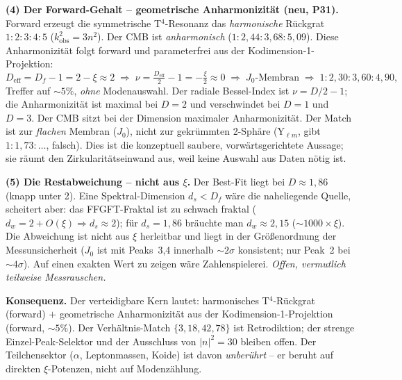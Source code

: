 \textbf{(4) Der Forward-Gehalt -- geometrische Anharmonizität (neu, P31).}
Forward erzeugt die symmetrische T$^4$-Resonanz das \emph{harmonische}
Rückgrat $1:2:3:4:5$ ($k^2_\mathrm{obs}=3n^2$). Der CMB ist
\emph{anharmonisch} ($1:2{,}44:3{,}68:5{,}09$). Diese Anharmonizität folgt
forward und parameterfrei aus der Kodimension-1-Projektion:
\[
  D_\mathrm{eff}=D_f-1=2-\xi\approx2
  \;\Rightarrow\;
  \nu=\tfrac{D_\mathrm{eff}}{2}-1=-\tfrac{\xi}{2}\approx0
  \;\Rightarrow\;
  J_0\text{-Membran}
  \;\Rightarrow\;
  1:2{,}30:3{,}60:4{,}90,
\]
Treffer auf $\sim5\%$, \emph{ohne} Modenauswahl. Der radiale Bessel-Index
ist $\nu=D/2-1$; die Anharmonizität ist maximal bei $D=2$ und verschwindet
bei $D=1$ und $D=3$. Der CMB sitzt bei der Dimension maximaler
Anharmonizität. Der Match ist zur \emph{flachen} Membran ($J_0$), nicht zur
gekrümmten 2-Sphäre (Y$_{\ell m}$, gibt $1:1{,}73:\ldots$, falsch). Dies ist
die konzeptuell saubere, vorwärtsgerichtete Aussage; sie räumt den
Zirkularitätseinwand aus, weil keine Auswahl aus Daten nötig ist.

\textbf{(5) Die Restabweichung -- nicht aus $\xi$.}
Der Best-Fit liegt bei $D\approx1{,}86$ (knapp unter 2). Eine
Spektral-Dimension $d_s<D_f$ wäre die naheliegende Quelle, scheitert aber:
das FFGFT-Fraktal ist zu schwach fraktal ($d_w=2+O(\xi)\Rightarrow
d_s\approx2$); für $d_s=1{,}86$ bräuchte man $d_w\approx2{,}15$
($\sim1000\times\xi$). Die Abweichung ist nicht aus $\xi$ herleitbar und
liegt in der Größenordnung der Messunsicherheit ($J_0$ ist mit Peaks~3,4
innerhalb $\sim2\sigma$ konsistent; nur Peak~2 bei $\sim4\sigma$). Auf einen
exakten Wert zu zeigen wäre Zahlenspielerei. \emph{Offen, vermutlich
teilweise Messrauschen.}

\textbf{Konsequenz.} Der verteidigbare Kern lautet: harmonisches
T$^4$-Rückgrat (forward) $+$ geometrische Anharmonizität aus der
Kodimension-1-Projektion (forward, $\sim5\%$). Der Verhältnis-Match
$\{3,18,42,78\}$ ist Retrodiktion; der strenge Einzel-Peak-Selektor und der
Ausschluss von $|n|^2=30$ bleiben offen. Der Teilchensektor ($\alpha$,
Leptonmassen, Koide) ist davon \emph{unberührt} -- er beruht auf direkten
$\xi$-Potenzen, nicht auf Modenzählung.



